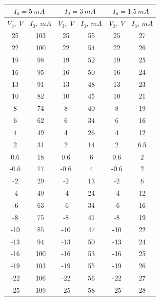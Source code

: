 \documentclass{article}
\begin{document}
\begin{table}[H]
    \centering
    \begin{tabular}{|c|c|c|c|c|c|}
    \hline
    \multicolumn{2}{|c|}{\(I_d = 5\: mA\)}& \multicolumn{2}{|c|}{\(I_d = 3\: mA\)} & \multicolumn{2}{|c|}{\(I_d = 1.5\: mA\)} \\\hline
    \(V_3,\; V\) & \(I_3,\: mA\) & \(V_3,\; V\) & \(I_3,\: mA\) & \(V_3,\; V\) & \(I_3,\: mA\)\\\hline
    25 & 103  & 25          & 55& 25           & 27 \\\hline
    22 & 100  & 22          & 54& 22           & 26 \\\hline
    19 & 98   & 19          & 52& 19           & 25 \\\hline
    16 & 95   & 16          & 50& 16           & 24 \\\hline
    13 & 91   & 13          & 48& 13           & 23 \\\hline
    10 & 82   & 10          & 45& 10           & 21 \\\hline
    8  & 74   & 8           & 40& 8            & 19 \\\hline
    6  & 62   & 6           & 34& 6            & 16 \\\hline
    4  & 49   & 4           & 26& 4            & 12 \\\hline
    2  & 31   & 2           & 14& 2            & 6.5\\\hline
    0.6& 18   & 0.6         & 6 & 0.6          & 2  \\\hline
    -0.6 &17  & -0.6        & 4 & -0.6         & 2  \\\hline
    -2 & 29   & -2          & 13& -2           & 6  \\\hline
    -4 & 49   & -4          & 24& -4           & 12 \\\hline
    -6 & 63   & -6          & 34& -6           & 16 \\\hline
    -8 & 75   & -8          & 41& -8           & 19 \\\hline
    -10& 85   & -10         & 47& -10          & 22 \\\hline
    -13& 94   & -13         & 50& -13          & 24 \\\hline
    -16& 100  & -16         & 53& -16          & 25 \\\hline
    -19& 103  & -19         & 55& -19          & 26 \\\hline
    -22& 106  & -22         & 56& -22          & 27 \\\hline
    -25& 109  & -25         & 58& -25          & 28 \\\hline
    \end{tabular}
\end{table}
\end{document}
